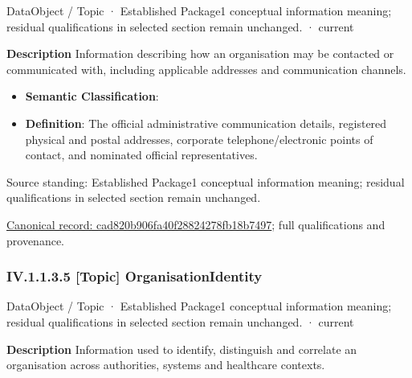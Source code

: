 \label{element:cad820b906fa40f28824278fb18b7497}
{\small DataObject / Topic · Established Package1 conceptual information meaning; residual qualifications in selected section remain unchanged. · current}\par

\textbf{Description}
Information describing how an organisation may be contacted or communicated with, including applicable addresses and communication channels.



\begin{itemize}


\item \textbf{Semantic Classification}: \texttt{}

\item \textbf{Definition}: The official administrative communication details, registered physical and postal addresses, corporate telephone/electronic points of contact, and nominated official representatives.

\end{itemize}


Source standing: Established Package1 conceptual information meaning; residual qualifications in selected section remain unchanged.


{\footnotesize \href{../../../../../../../../continuum/application/data-object/topic/cad820b906fa40f28824278fb18b7497.md}{Canonical record: cad820b906fa40f28824278fb18b7497}; full qualifications and provenance.}\par
\subsubsection*{IV.1.1.3.5 [Topic] OrganisationIdentity}
\label{navigation:IV.1.1.3.5}

\label{element:c240be16de76415682237a238b3d3fc8}
{\small DataObject / Topic · Established Package1 conceptual information meaning; residual qualifications in selected section remain unchanged. · current}\par

\textbf{Description}
Information used to identify, distinguish and correlate an organisation across authorities, systems and healthcare contexts.



